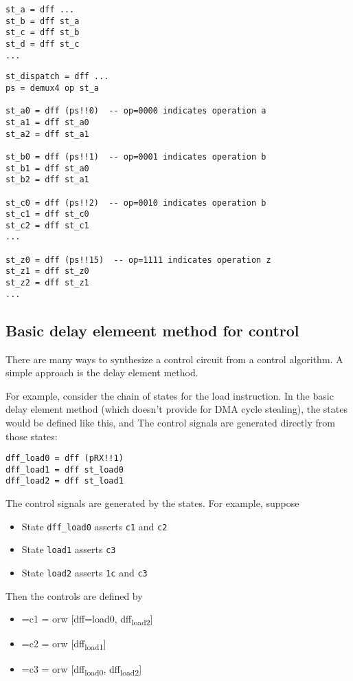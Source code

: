 \documentclass[11pt]{article}
\begin{document}
\begin{verbatim}
st_a = dff ...
st_b = dff st_a
st_c = dff st_b
st_d = dff st_c
...
\end{verbatim}

\begin{verbatim}
st_dispatch = dff ...
ps = demux4 op st_a

st_a0 = dff (ps!!0)  -- op=0000 indicates operation a
st_a1 = dff st_a0
st_a2 = dff st_a1

st_b0 = dff (ps!!1)  -- op=0001 indicates operation b
st_b1 = dff st_a0
st_b2 = dff st_a1

st_c0 = dff (ps!!2)  -- op=0010 indicates operation b
st_c1 = dff st_c0
st_c2 = dff st_c1
...

st_z0 = dff (ps!!15)  -- op=1111 indicates operation z
st_z1 = dff st_z0
st_z2 = dff st_z1
...
\end{verbatim}

\subsection{Basic delay elemeent method for control}
\label{sec:orgd5100f6}

There are many ways to synthesize a control circuit from a control
algorithm.  A simple approach is the delay element method.

For example, consider the chain of states for the load instruction.
In the basic delay element method (which doesn't provide for DMA cycle
stealing), the states would be defined like this, and The control
signals are generated directly from those states:

\begin{verbatim}
dff_load0 = dff (pRX!!1)
dff_load1 = dff st_load0
dff_load2 = dff st_load1
\end{verbatim}

The control signals are generated by the states.  For example, suppose
\begin{itemize}
\item State \texttt{dff\_load0} asserts \texttt{c1} and \texttt{c2}
\item State \texttt{load1} asserts \texttt{c3}
\item State \texttt{load2} asserts \texttt{1c} and \texttt{c3}
\end{itemize}
Then the controls are defined by
\begin{itemize}
\item =c1 = orw [dff=load0, dff\textsubscript{load2}]
\item =c2 = orw [dff\textsubscript{load1}]
\item =c3 = orw [dff\textsubscript{load0}, dff\textsubscript{load2}]
\end{itemize}
\end{document}
